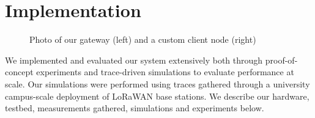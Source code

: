 \section{Implementation}
\label{sec:arch}



\begin{figure}%
\centering
\compactimg
{}
\hfill
{}
\caption{Photo of our gateway (left) and a custom client node (right)}
\end{figure}



We implemented and evaluated our system extensively both through proof-of-concept experiments and trace-driven simulations to evaluate performance at scale. Our simulations were performed using traces gathered through a university campus-scale deployment of LoRaWAN base stations. We describe our hardware, testbed, measurements gathered, simulations and experiments below. 





